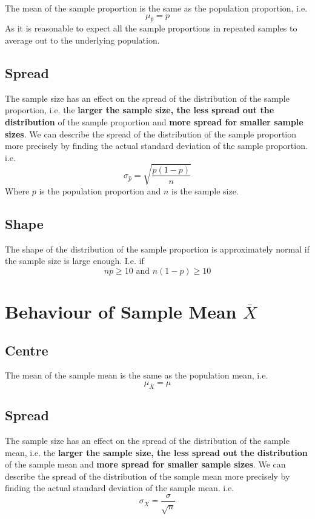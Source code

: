 \documentclass[12pt letter]{report}
\begin{document}
The mean of the sample proportion is the same as the population proportion, i.e.
\[
	\mu_{\hat{p}} = p
\]
As it is reasonable to expect all the sample proportions in repeated samples to average out to the underlying population.

\subsection{Spread}

The sample size has an effect on the spread of the distribution of the sample proportion, i.e. the \textbf{larger the sample
	size, the less spread out the distribution} of the sample proportion and \textbf{more spread for smaller sample
	sizes}. We can describe the spread of the distribution of the sample proportion more precisely by finding the actual
standard deviation of the sample proportion. i.e.
\[
	\sigma_{\hat{p}} = \sqrt{\frac{p \left( 1 - p \right) }{n}}
\]
Where $p$ is the population proportion and $n$ is the sample size.

\subsection{Shape}

The shape of the distribution of the sample proportion is approximately normal if the sample size is large enough. I.e.
if
\[
	np \geq 10 \text{ and } n \left( 1 - p \right) \geq 10
\]


\section{Behaviour of Sample Mean $\overline{X}$}

\subsection{Centre}

The mean of the sample mean is the same as the population mean, i.e.
\[
	\mu_{\overline{X}} = \mu
\]

\subsection{Spread}

The sample size has an effect on the spread of the distribution of the sample mean, i.e. the \textbf{larger the sample
	size, the less spread out the distribution} of the sample mean and \textbf{more spread for smaller sample sizes}. We can
describe the spread of the distribution of the sample mean more precisely by finding the actual standard deviation of the
sample mean. i.e.
\[
	\sigma_{\overline{X}} = \frac{\sigma}{\sqrt{n}}
\]
\end{document}
